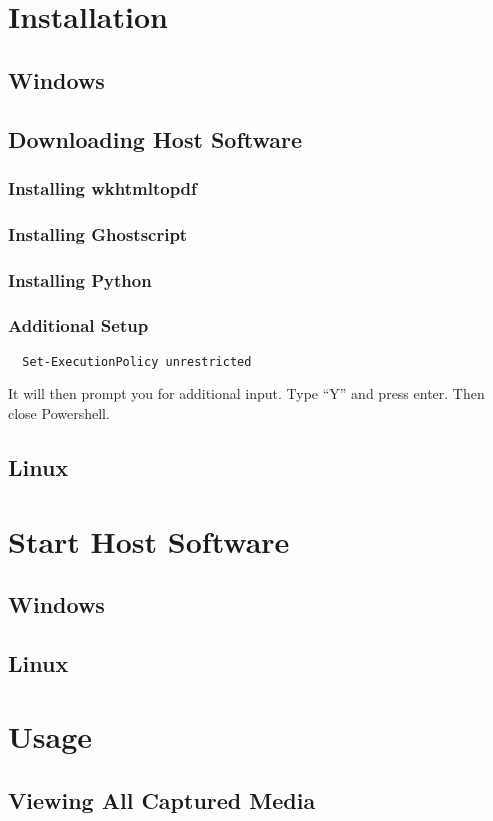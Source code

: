 \documentclass[12pt]{article}
\begin{document}

\tableofcontents
\newpage
\section{Installation}
\subsection{Windows}
\subsection{Downloading Host Software}
\subsubsection{Installing wkhtmltopdf}
\subsubsection{Installing Ghostscript}
\subsubsection{Installing Python}
\subsubsection{Additional Setup}
\begin{verbatim}
  Set-ExecutionPolicy unrestricted
\end{verbatim}
It will then prompt you for additional input. Type ``Y'' and press enter. Then close Powershell.
\subsection{Linux}
\section{Start Host Software}
\subsection{Windows}
\subsection{Linux}
\section{Usage}
\subsection{Viewing All Captured Media}
\end{document}
